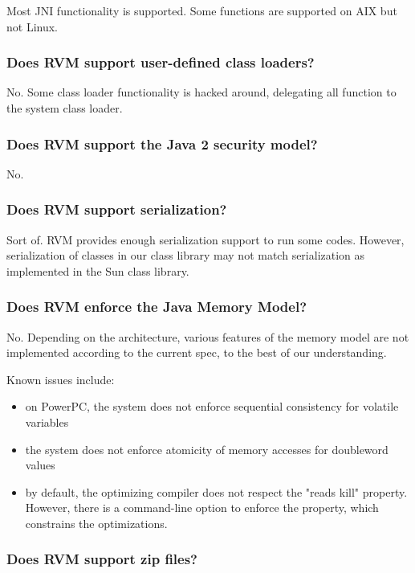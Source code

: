 Most JNI functionality is supported.  Some functions are supported on AIX
but not Linux.

\subsubsection{Does RVM support user-defined class loaders?}

No. Some class loader functionality is hacked around, delegating all
function to the system class loader.  

\subsubsection{Does RVM support the Java 2 security model?}

No. 

\subsubsection{Does RVM support serialization?}

Sort of.  RVM provides enough serialization support to run some codes.  
However, serialization of classes in our class library may not match
serialization as implemented in the Sun class library.

\subsubsection{Does RVM enforce the Java Memory Model?}

No. Depending on the architecture, various features of the memory model
are not implemented according to the current spec, to the best of our
understanding.

Known issues include:
\begin{itemize}
\item on PowerPC, the system does not enforce sequential consistency for
volatile variables
\item the system does not enforce atomicity of memory accesses for
doubleword values
\item by default, the optimizing compiler does not respect the "reads
kill" property.  However, there is a command-line option to enforce the
property, which constrains the optimizations.
\end{itemize}


\subsubsection{Does RVM support zip files?}

